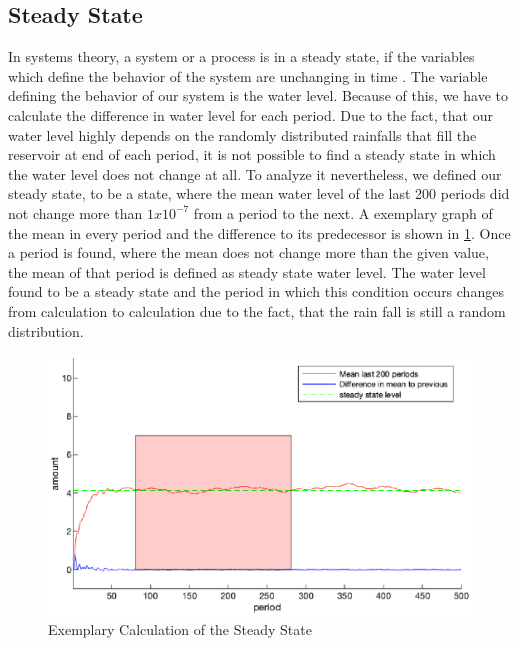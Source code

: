 \documentclass[12pt, a4paper, oneside]{article}
\begin{document}
\subsection{Steady State}
In systems theory, a system or a process is in a steady state, if the variables which define the behavior of the system are unchanging in time \cite{gagniuc2017markov}. 
The variable defining the behavior of our system is the water level. 
Because of this, we have to calculate the difference in water level for each period. 
Due to the fact, that our water level highly depends on the randomly distributed rainfalls that fill the reservoir at end of each period, it is not possible to find a steady state in which the water level does not change at all. %
To analyze it nevertheless, we defined our steady state, to be a state, where the mean water level of the last 200 periods did not change more than $1x10^{-7}$ from a period to the next.
A exemplary graph of the mean in every period and the difference to its predecessor is shown in \ref{fig:steadyState}.
Once a period is found, where the mean does not change more than the given value, the mean of that period is defined as steady state water level.
The water level found to be a steady state and the period in which this condition occurs changes from calculation to calculation due to the fact, that the rain fall is still a random distribution.
\begin{figure}[ht]
	\includegraphics[width=1\textwidth]{figures/steadyState.eps}
	\caption{Exemplary Calculation of the Steady State}
	\label{fig:steadyState}
\end{figure}
\end{document}
